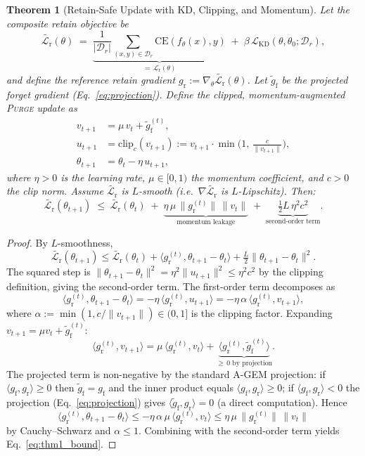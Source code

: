 \documentclass{article}
\newcommand{\ours}{\textsc{Purge}}
\newcommand{\CE}{\mathrm{CE}}
\newcommand{\Dr}{\mathcal{D}_r}
\newcommand{\gf}{g_{\mathrm{f}}}
\newcommand{\gr}{g_{\mathrm{r}}}
\newcommand{\gproj}{\tilde{g}_{\mathrm{f}}}
\newcommand{\lossr}{\mathcal{L}_{\mathrm{r}}}
\newcommand{\losskd}{\mathcal{L}_{\mathrm{KD}}}
\newtheorem{theorem}{Theorem}
\newcommand{\new}[1]{{\color{orange}#1}}
\begin{document}
\begin{theorem}[Retain-Safe Update with KD, Clipping, and Momentum]
\label{thm:retain_safety}
\new{Let the composite retain objective be
\[
\widetilde{\lossr}(\theta) \;=\; \underbrace{\frac{1}{|\Dr|}\!\sum_{(x,y)\in\Dr}\!\!\CE(f_\theta(x),y)}_{=\,\lossr(\theta)} \;+\; \beta\, \losskd(\theta,\theta_0;\Dr),
\]
and define the reference retain gradient $\gr := \nabla_\theta \widetilde{\lossr}(\theta)$. Let $\gproj$ be the projected forget gradient (Eq.~\ref{eq:projection}). Define the clipped, momentum-augmented \ours{} update as
\begin{equation}\label{eq:update_full}
\begin{aligned}
v_{t+1} &= \mu\, v_t + \gproj^{(t)}, \\
u_{t+1} &= \mathrm{clip}_c(v_{t+1}) := v_{t+1} \cdot \min\!\Big(1,\, \tfrac{c}{\|v_{t+1}\|}\Big), \\
\theta_{t+1} &= \theta_t - \eta\, u_{t+1},
\end{aligned}
\end{equation}
where $\eta>0$ is the learning rate, $\mu\in[0,1)$ the momentum coefficient, and $c>0$ the clip norm. Assume $\widetilde{\lossr}$ is $L$-smooth (i.e.\ $\nabla\widetilde{\lossr}$ is $L$-Lipschitz). Then:
\begin{equation}\label{eq:thm1_bound}
\widetilde{\lossr}(\theta_{t+1}) \;\le\; \widetilde{\lossr}(\theta_t) \;+\; \underbrace{\eta\,\mu \,\|\gr^{(t)}\|\,\|v_t\|}_{\text{momentum leakage}} \;+\; \underbrace{\tfrac{1}{2}L\,\eta^2 c^2}_{\text{second-order term}}.
\end{equation}}
\end{theorem}

\begin{proof}
\new{By $L$-smoothness,
\[
\widetilde{\lossr}(\theta_{t+1}) \le \widetilde{\lossr}(\theta_t) + \langle \gr^{(t)}, \theta_{t+1}-\theta_t\rangle + \tfrac{L}{2}\|\theta_{t+1}-\theta_t\|^2.
\]
The squared step is $\|\theta_{t+1}-\theta_t\|^2 = \eta^2\|u_{t+1}\|^2 \le \eta^2 c^2$ by the clipping definition, giving the second-order term. The first-order term decomposes as
\[
\langle \gr^{(t)}, \theta_{t+1}-\theta_t\rangle = -\eta\,\langle \gr^{(t)}, u_{t+1}\rangle = -\eta\,\alpha\,\langle \gr^{(t)}, v_{t+1}\rangle,
\]
where $\alpha := \min(1, c/\|v_{t+1}\|)\in(0,1]$ is the clipping factor. Expanding $v_{t+1} = \mu v_t + \gproj^{(t)}$:
\[
\langle \gr^{(t)}, v_{t+1}\rangle = \mu\,\langle \gr^{(t)}, v_t\rangle + \underbrace{\langle \gr^{(t)}, \gproj^{(t)}\rangle}_{\ge\, 0 \text{ by projection}}.
\]
The projected term is non-negative by the standard A-GEM projection: if $\langle \gf, \gr\rangle\ge 0$ then $\gproj=\gf$ and the inner product equals $\langle \gf,\gr\rangle\ge 0$; if $\langle\gf,\gr\rangle<0$ the projection (Eq.~\ref{eq:projection}) gives $\langle \gproj,\gr\rangle = 0$ (a direct computation). Hence
\[
\langle \gr^{(t)}, \theta_{t+1}-\theta_t\rangle \le -\eta\,\alpha\,\mu\,\langle\gr^{(t)},v_t\rangle \le \eta\,\mu\,\|\gr^{(t)}\|\,\|v_t\|
\]
by Cauchy--Schwarz and $\alpha\le 1$. Combining with the second-order term yields Eq.~\ref{eq:thm1_bound}.}
\end{proof}
\end{document}
